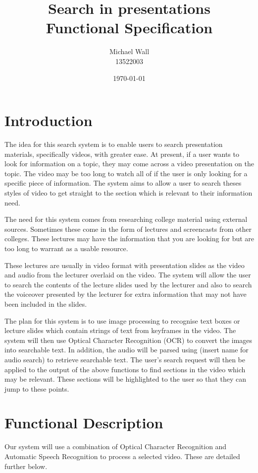 \documentclass[a4paper,12pt]{article}
\title{Search in presentations\\Functional Specification}
\author{Michael Wall\\13522003}
\date{\today}
\begin{document}
\maketitle
\newpage

\tableofcontents

\newpage

\section{Introduction}
The idea for this search system is to enable users to search presentation materials, specifically videos, with greater ease. At present, if a user wants to look for information on a topic, they may come across a video presentation on the topic. The video may be too long to watch all of if the user is only looking for a specific piece of information. The system aims to allow a user to search theses styles of video to get straight to the section which is relevant to their information need.

The need for this system comes from researching college material using external sources. Sometimes these come in the form of lectures and screencasts from other colleges. These lectures may have the information that you are looking for but are too long to warrant as a usable resource.

These lectures are usually in video format with presentation slides as the video and audio from the lecturer overlaid on the video. The system will allow the user to search the contents of the lecture slides used by the lecturer and also to search the voiceover presented by the lecturer for extra information that may not have been included in the slides.

The plan for this system is to use image processing to recognise text boxes or lecture slides which contain strings of text from keyframes in the video. The system will then use Optical Character Recognition (OCR) to convert the images into searchable text. In addition, the audio will be parsed using (insert name for audio search) to retrieve searchable text. The user’s search request will then be applied to the output of the above functions to find sections in the video which may be relevant. These sections will be highlighted to the user so that they can jump to these points.

\section{Functional Description}
Our system will use a combination of Optical Character Recognition and Automatic Speech Recognition to process a selected video. These are detailed further below.
\end{document}
